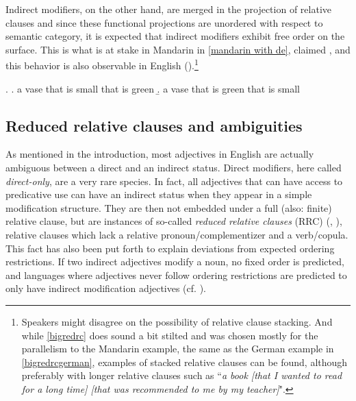 Indirect modifiers, on the other hand, are merged in the projection of relative clauses and since these functional projections are unordered with respect to semantic category, it is expected that indirect modifiers exhibit free order on the surface. This is what is at stake in Mandarin in \ref{mandarin with de}, claimed \citet{sproat:1991:the}, and this behavior is also observable in English (\citealt{baker:2003:verbal}).\footnote{Speakers might disagree on the possibility of relative clause stacking. And while \ref{bigredrc} does sound a bit stilted and was chosen mostly for the parallelism to the Mandarin example, the same as the German example in \ref{bigredrcgerman}, examples of stacked relative clauses can be found, although preferably with longer relative clauses such as ``\textit{a book [that I wanted to read for a long time] [that was recommended to me by my teacher]}".}

\ex. \label{bigredrc} \a. a vase that is small that is green
\b. a vase that is green that is small

\subsection{Reduced relative clauses and ambiguities} \label{ambiguities}

As mentioned in the introduction, most adjectives in English are actually ambiguous between a direct and an indirect status. Direct modifiers, here called \textit{direct-only}, are a very rare species. In fact, all adjectives that can have access to predicative use can have an indirect status when they appear in a simple modification structure. They are then not embedded under a full (also: finite) relative clause, but are instances of so-called \textit{reduced relative clauses} (RRC) (\citealt[54–55]{cinque:2010:adj}, \citealt{douglas:2016:syntactic, harwood:2018:rrc}), relative clauses which lack a relative pronoun/complementizer and a verb/copula. This fact has also been put forth to explain deviations from expected ordering restrictions. If two indirect adjectives modify a noun, no fixed order is predicted, and languages where adjectives never follow ordering restrictions are predicted to only have indirect modification adjectives (cf. \citealt[§ 3.3.2]{cinque:2010:adj}).

